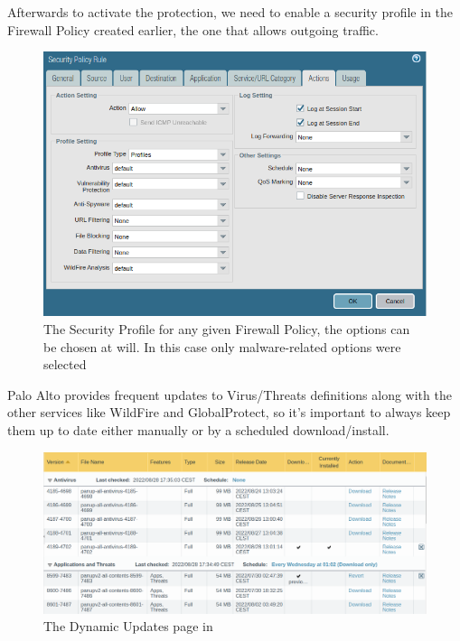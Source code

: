 \newpage

Afterwards to activate the protection, we need to enable a security profile in the Firewall Policy created earlier, the one that allows outgoing traffic.

\begin{figure}[h!]
 \centering
 \includegraphics[width=13.5cm]{img/policy_security.png}
 \caption{The Security Profile for any given Firewall Policy, the options can be chosen at will. In this case only malware-related options were selected}
 \label{fig: Policy Security Profile}
\end{figure}

Palo Alto provides frequent updates to Virus/Threats definitions along with the other services like WildFire and GlobalProtect, so it's important to always keep them up to date either manually or by a scheduled download/install.

\begin{figure}[h!]
 \centering
 \includegraphics[width=13.7cm]{img/updates.png}
 \caption{The Dynamic Updates page in }
 \label{fig: updates}
\end{figure}



